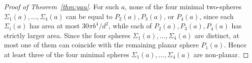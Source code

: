 \documentclass[10pt,a4paper]{amsart}
\begin{document}
\begin{proof}[Proof of Theorem~\ref{thm:yau}]
For such \(a\), none of the four minimal two-spheres
\(\Sigma_1(a),\ldots,\Sigma_4(a)\) can be equal to \(P_2(a),P_3(a)\), or \(P_4(a)\), since each \(\Sigma_i(a)\) has area at most \(30\pi b^4/d^2\), while each of \(P_2(a),P_3(a),P_4(a)\) has strictly larger area. Since the four spheres \(\Sigma_1(a),\ldots,\Sigma_4(a)\) are distinct, at most one of them can coincide with the remaining planar sphere \(P_1(a)\). Hence at least three of the four minimal spheres \(\Sigma_1(a),\ldots,\Sigma_4(a)\) are non-planar.
\end{proof}
\end{document}
